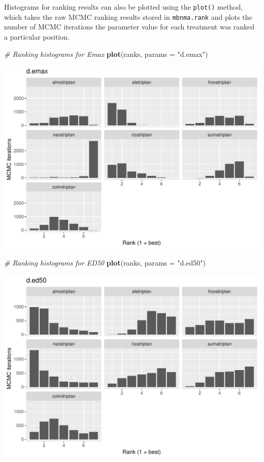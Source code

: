 \documentclass[]{article}
\newenvironment{Shaded}{\begin{snugshade}}{\end{snugshade}}
\newcommand{\CommentTok}[1]{\textcolor[rgb]{0.56,0.35,0.01}{\textit{#1}}}
\newcommand{\DataTypeTok}[1]{\textcolor[rgb]{0.13,0.29,0.53}{#1}}
\newcommand{\KeywordTok}[1]{\textcolor[rgb]{0.13,0.29,0.53}{\textbf{#1}}}
\newcommand{\NormalTok}[1]{#1}
\newcommand{\StringTok}[1]{\textcolor[rgb]{0.31,0.60,0.02}{#1}}
\begin{document}
Histograms for ranking results can also be plotted using the
\texttt{plot()} method, which takes the raw MCMC ranking results stored
in \texttt{mbnma.rank} and plots the number of MCMC iterations the
parameter value for each treatment was ranked a particular position.

\begin{Shaded}
\begin{Highlighting}[]
\CommentTok{# Ranking histograms for Emax}
\KeywordTok{plot}\NormalTok{(ranks, }\DataTypeTok{params =} \StringTok{"d.emax"}\NormalTok{)}
\end{Highlighting}
\end{Shaded}

\includegraphics{mbnmadose_files/figure-latex/unnamed-chunk-38-1.pdf}

\begin{Shaded}
\begin{Highlighting}[]

\CommentTok{# Ranking histograms for ED50}
\KeywordTok{plot}\NormalTok{(ranks, }\DataTypeTok{params =} \StringTok{"d.ed50"}\NormalTok{)}
\end{Highlighting}
\end{Shaded}

\includegraphics{mbnmadose_files/figure-latex/unnamed-chunk-38-2.pdf}
\end{document}

